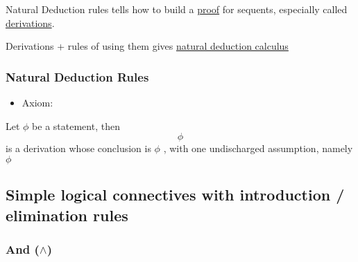 \documentclass[11pt]{article}
\begin{document}
Natural Deduction rules tells how to build a \uline{proof} for sequents,
especially called \uline{derivations}.

Derivations + rules of using them gives \uline{natural deduction calculus}

\subsubsection{Natural Deduction Rules}
\label{sec:orgheadline5}

\begin{itemize}
\item Axiom:
\end{itemize}
Let \(\phi\) be a statement, then
      \[ \phi \]
is a derivation whose conclusion is \(\phi\) , with one undischarged assumption, namely \(\phi\)


\subsection{Simple logical connectives with introduction / elimination rules}
\label{sec:orgheadline23}

\subsubsection{And (\(\wedge\))}
\label{sec:orgheadline9}
\end{document}
